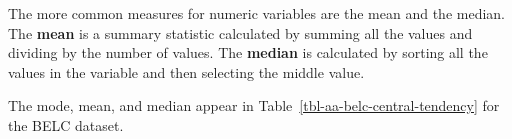 \documentclass[
  letterpaper,
]{latex/krantz}
\theoremstyle{definition}
\theoremstyle{remark}
\begin{document}
The more common measures for numeric variables are the mean and the
median. The \textbf{mean} is a summary statistic calculated by summing
all the values and dividing by the number of values. The \textbf{median}
is calculated by sorting all the values in the variable and then
selecting the middle value.

The mode, mean, and median appear in
Table~\ref{tbl-aa-belc-central-tendency} for the BELC dataset.

\begin{table}

\caption{\label{tbl-aa-belc-central-tendency}Central tendency measures
for the BELC dataset.}

\begin{minipage}{0.50\linewidth}



\end{minipage}%
%
\begin{minipage}{0.50\linewidth}



\end{minipage}%

\end{table}%
\end{document}
